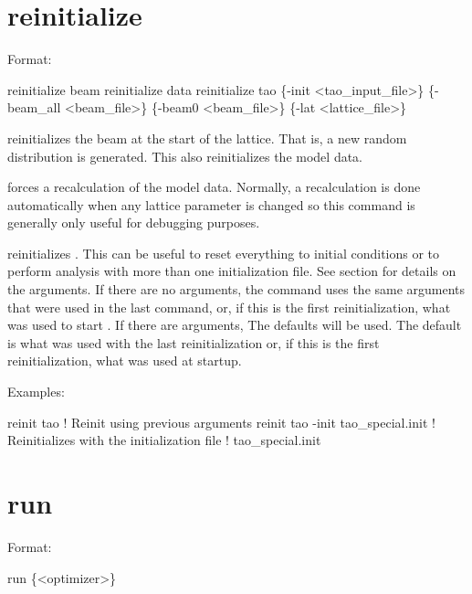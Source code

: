 {{{%
\section{reinitialize}
\label{s:reinit}

Format:
\begin{example}
  reinitialize beam
  reinitialize data
  reinitialize tao \{-init <tao_input_file>\} \{-beam_all <beam_file>\} 
                          \{-beam0 <beam_file>\} \{-lat <lattice_file>\}
\end{example}

\vskip 0.2in 
 reinitializes the beam at the start of the
lattice.  That is, a new random distribution is generated. This also
reinitializes the model data.

 forces a recalculation of the model data.
Normally, a recalculation is done automatically when any lattice
parameter is changed so this command is generally only useful for
debugging purposes.

 reinitializes \tao. This can be useful to reset
everything to initial conditions or to perform analysis with more than
one initialization file.  See section  for
details on the arguments.  If there are no arguments, the
 command uses the same arguments that were used in
the last  command, or, if this is the first
reinitialization, what was used to start \tao. If there are arguments,
The defaults will be used.  The default  is what was
used with the last reinitialization or, if this is the first
reinitialization, what was used at startup.

Examples:
\begin{example}
  reinit tao                         ! Reinit using previous arguments
  reinit tao -init tao_special.init  ! Reinitializes \tao with the initialization file 
                                     !   tao_special.init
\end{example}


\section{run}
\label{s:run}

Format:
\begin{example}
  run \{<optimizer>\}
\end{example}

}}}
